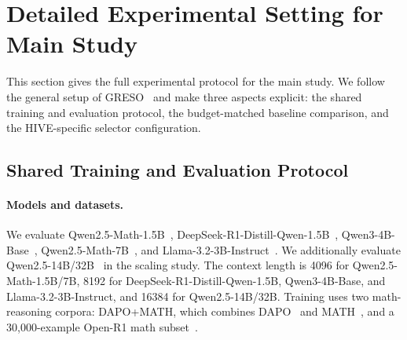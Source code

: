
\section{Detailed Experimental Setting for Main Study}
\label{appendix-sec:detailed-experimental-setting}

This section gives the full experimental protocol for the main study. We follow the general setup of GRESO~\cite{zheng2025act} and make three aspects explicit: the shared training and evaluation protocol, the budget-matched baseline comparison, and the HIVE-specific selector configuration.

\subsection{Shared Training and Evaluation Protocol}
\label{appendix-subsec:shared-exp-protocol}

\paragraph{Models and datasets.}
We evaluate Qwen2.5-Math-1.5B~\cite{yang2024qwen25mathtechnicalreportmathematical}, DeepSeek-R1-Distill-Qwen-1.5B~\cite{guo2025deepseek}, Qwen3-4B-Base~\cite{yang2025qwen3technicalreport}, Qwen2.5-Math-7B~\cite{yang2024qwen25mathtechnicalreportmathematical}, and Llama-3.2-3B-Instruct~\cite{grattafiori2024llama3}. We additionally evaluate Qwen2.5-14B/32B~\cite{qwen2.5-large} in the scaling study. The context length is 4096 for Qwen2.5-Math-1.5B/7B, 8192 for DeepSeek-R1-Distill-Qwen-1.5B, Qwen3-4B-Base, and Llama-3.2-3B-Instruct, and 16384 for Qwen2.5-14B/32B. Training uses two math-reasoning corpora: DAPO+MATH, which combines DAPO~\cite{yu2025dapo} and MATH~\cite{hendrycks2021measuringmathematicalproblemsolving}, and a 30,000-example Open-R1 math subset~\cite{openr1}.

